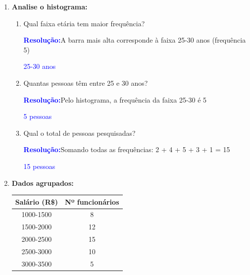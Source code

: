 \documentclass[11pt]{article}
\newcommand{\respostaNum}[1]{\textcolor{blue}{\boxed{#1}}}   %
\newcommand{\respostaTxt}[1]{\textcolor{blue}{#1}}           %
\newcommand{\resolucao}{\textbf{\textcolor{blue}{Resolução:}}}
\begin{document}
\begin{multicols}{2}
\begin{enumerate}[leftmargin=*]
\begin{enumerate}[label=\alph*)]
\item As temperaturas máximas de uma semana foram: 28°, 30°, 29°, 31°, 32°, 30°, 29°C. Calcule a temperatura média.

\resolucao
\[
\bar{x} = \frac{28 + 30 + 29 + 31 + 32 + 30 + 29}{7} \]
\[= \frac{209}{7} \approx \respostaNum{29,86°C}
\]
\end{enumerate}

\item \textbf{Analise o histograma:}

\begin{center}
\end{center}

\begin{enumerate}[label=\alph*)]
\item Qual faixa etária tem maior frequência?

\resolucao A barra mais alta corresponde à faixa 25-30 anos (frequência 5)

\respostaTxt{25-30 anos}

\item Quantas pessoas têm entre 25 e 30 anos?

\resolucao Pelo histograma, a frequência da faixa 25-30 é 5

\respostaTxt{5 pessoas}

\item Qual o total de pessoas pesquisadas?

\resolucao Somando todas as frequências: 2 + 4 + 5 + 3 + 1 = 15

\respostaTxt{15 pessoas}
\end{enumerate}

\item \textbf{Dados agrupados:}

\begin{center}
\begin{tabular}{|c|c|}
\hline
\textbf{Salário (R\$)} & \textbf{Nº funcionários} \\
\hline
1000-1500 & 8 \\
1500-2000 & 12 \\
2000-2500 & 15 \\
2500-3000 & 10 \\
3000-3500 & 5 \\
\hline
\end{tabular}
\end{center}


\end{enumerate}
\end{multicols}
\end{document}
